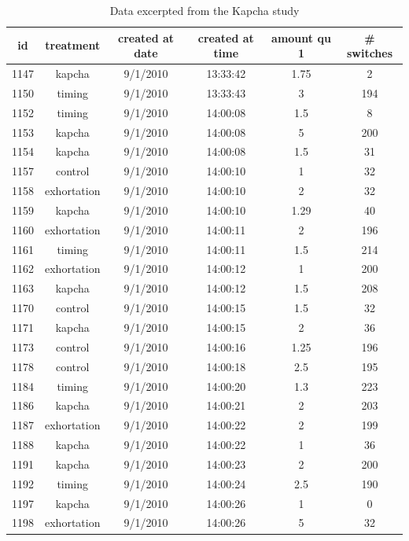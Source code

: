 \documentclass[12pt]{article}
\begin{document}
\begin{table}[htp]
\centering
\footnotesize
\begin{tabular}{c|c|c|c|c|c}
id	& treatment &	created at date	& created at time & amount qu 1 & \# switches \\
\hline
1147	&kapcha	&9/1/2010	&13:33:42	&1.75	&2 \\																						
1150	&timing	&9/1/2010	&13:33:43	&3	&194 \\																						
1152	&timing	&9/1/2010	&14:00:08	&1.5	&8 \\																						
1153	&kapcha	&9/1/2010	&14:00:08	&5	&200 \\																						
1154	&kapcha	&9/1/2010	&14:00:08	&1.5	&31 \\																						
1157	&control	&9/1/2010	&14:00:10	&1	&32 \\																						
1158	&exhortation	&9/1/2010	&14:00:10	&2	&32 \\																						
1159	&kapcha	&9/1/2010	&14:00:10	&1.29	&40 \\																						
1160	&exhortation	&9/1/2010	&14:00:11	&2	&196 \\																						
1161	&timing	&9/1/2010	&14:00:11	&1.5	&214 \\																						
1162	&exhortation	&9/1/2010	&14:00:12	&1	&200 \\																						
1163	&kapcha	&9/1/2010	&14:00:12	&1.5	&208 \\																					
1170	&control	&9/1/2010	&14:00:15	&1.5	&32 \\																						
1171	&kapcha	&9/1/2010	&14:00:15	&2	&36 \\																						
1173	&control	&9/1/2010	&14:00:16	&1.25	&196 \\																						
1178	&control	&9/1/2010	&14:00:18	&2.5	&195 \\																						
1184	&timing	&9/1/2010	&14:00:20	&1.3	&223 \\																						
1186	&kapcha	&9/1/2010	&14:00:21	&2	&203 \\																						
1187	&exhortation	&9/1/2010	&14:00:22	&2	&199 \\																						
1188	&kapcha	&9/1/2010	&14:00:22	&1	&36 \\																						
1191	&kapcha	&9/1/2010	&14:00:23	&2	&200 \\																						
1192	&timing	&9/1/2010	&14:00:24	&2.5	&190 \\																						
1197	&kapcha	&9/1/2010	&14:00:26	&1	&0 \\																						
1198	&exhortation	&9/1/2010	&14:00:26	&5	&32 \\																						
\end{tabular}
\caption{Data excerpted from the Kapcha study}
\label{tab:kapcha_data}
\end{table}
\end{document}
